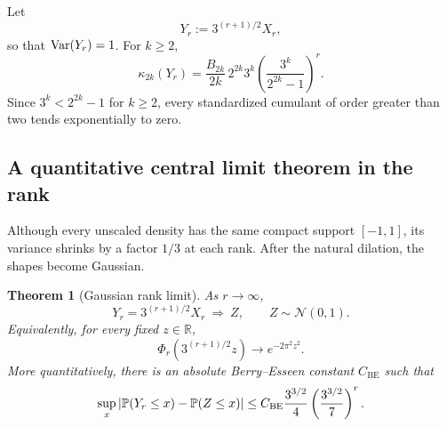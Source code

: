 \documentclass[11pt,oneside]{article}
\newtheorem{theorem}{Theorem}[section]
\theoremstyle{definition}
\theoremstyle{remark}
\newcommand{\R}{\mathbb R}
\begin{document}
\begin{corollary}\label{p3:cor:standard-cumulants}
Let
\begin{equation}\label{p3:eq:Yr}
  Y_r:=3^{(r+1)/2}X_r,
\end{equation}
so that $\operatorname{Var}(Y_r)=1$.  For $k\ge2$,
\begin{equation}\label{p3:eq:standard-cumulants}
 \kappa_{2k}(Y_r)
 =\frac{B_{2k}}{2k}\,2^{2k}3^k
  \left(\frac{3^k}{2^{2k}-1}\right)^r.
\end{equation}
Since $3^k<2^{2k}-1$ for $k\ge2$, every standardized cumulant of order greater than two tends exponentially to zero.
\end{corollary}

\subsection{A quantitative central limit theorem in the rank}

Although every unscaled density has the same compact support $[-1,1]$, its variance shrinks by a factor $1/3$ at each rank.  After the natural dilation, the shapes become Gaussian.

\begin{theorem}[Gaussian rank limit]\label{p3:thm:gaussian-limit}
As $r\to\infty$,
\begin{equation}\label{p3:eq:gaussian-limit}
  Y_r=3^{(r+1)/2}X_r\ \Longrightarrow\ Z,
  \qquad Z\sim\mathcal N(0,1).
\end{equation}
Equivalently, for every fixed $z\in\R$,
\begin{equation}\label{p3:eq:gaussian-fourier-limit}
  \Phi_r\!\left(3^{(r+1)/2}z\right)
  \longrightarrow e^{-2\pi^2z^2}.
\end{equation}
More quantitatively, there is an absolute Berry--Esseen constant $C_{\mathrm{BE}}$ such that
\begin{equation}\label{p3:eq:berry-esseen-r}
 \sup_x\left|\mathbb P(Y_r\le x)-\mathbb P(Z\le x)\right|
 \le C_{\mathrm{BE}}\frac{3^{3/2}}4
 \left(\frac{3^{3/2}}7\right)^r.
\end{equation}
\end{theorem}
\end{document}
